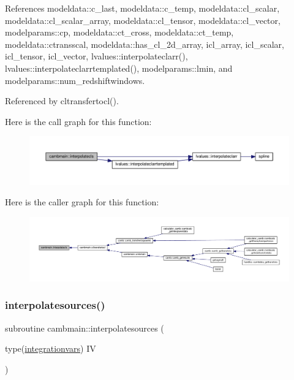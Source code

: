 References modeldata\+::c\+\_\+last, modeldata\+::c\+\_\+temp, modeldata\+::cl\+\_\+scalar, modeldata\+::cl\+\_\+scalar\+\_\+array, modeldata\+::cl\+\_\+tensor, modeldata\+::cl\+\_\+vector, modelparams\+::cp, modeldata\+::ct\+\_\+cross, modeldata\+::ct\+\_\+temp, modeldata\+::ctransscal, modeldata\+::has\+\_\+cl\+\_\+2d\+\_\+array, icl\+\_\+array, icl\+\_\+scalar, icl\+\_\+tensor, icl\+\_\+vector, lvalues\+::interpolateclarr(), lvalues\+::interpolateclarrtemplated(), modelparams\+::lmin, and modelparams\+::num\+\_\+redshiftwindows.



Referenced by cltransfertocl().

Here is the call graph for this function\+:
\nopagebreak
\begin{figure}[H]
\begin{center}
\leavevmode
\includegraphics[width=350pt]{namespacecambmain_a411e6e866cbb05f2ba3f7164f8e04a67_cgraph}
\end{center}
\end{figure}
Here is the caller graph for this function\+:
\nopagebreak
\begin{figure}[H]
\begin{center}
\leavevmode
\includegraphics[width=350pt]{namespacecambmain_a411e6e866cbb05f2ba3f7164f8e04a67_icgraph}
\end{center}
\end{figure}
\mbox{\label{namespacecambmain_a7e1e9bb292a8b4d778e9b8d218ee4036}} 
\subsubsection{\texorpdfstring{interpolatesources()}{interpolatesources()}}
{\footnotesize\ttfamily subroutine cambmain\+::interpolatesources (\begin{DoxyParamCaption}\item[{type(\mbox{\hyperlink{structcambmain_1_1integrationvars}{integrationvars}})}]{IV }\end{DoxyParamCaption})\hspace{0.3cm}{\ttfamily [private]}}



